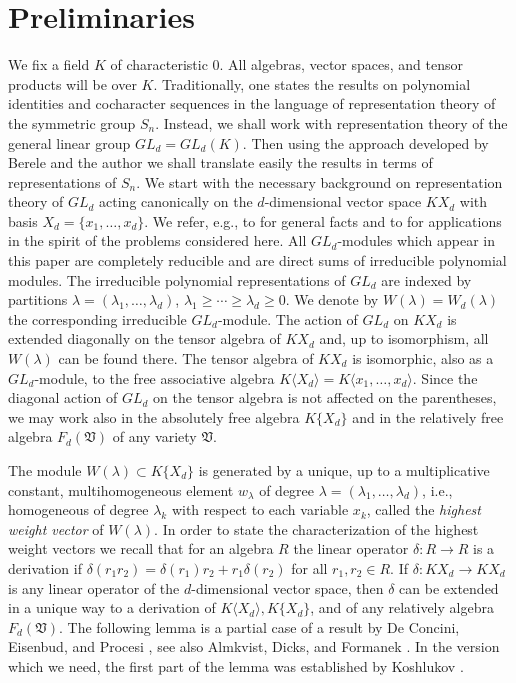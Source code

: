 \documentclass{amsart}[12pt]
\theoremstyle{definition}
\begin{document}
\section{Preliminaries}

We fix a field $K$ of characteristic 0. All algebras, vector spaces, and tensor products will be over $K$.
Traditionally, one states the results on polynomial identities and cocharacter sequences in the language of representation theory
of the symmetric group $S_n$. Instead, we shall work with representation theory
of the general linear group $GL_d=GL_d(K)$. Then using the approach developed by Berele \cite{B} and the author \cite{D0}
we shall translate easily the results in terms of representations of $S_n$.
We start with the necessary background on representation theory
of $GL_d$ acting canonically on the $d$-dimensional vector space $KX_d$
with basis $X_d=\{x_1,\ldots,x_d\}$.
We refer, e.g., to \cite{M} for general facts and to \cite{D2}  for applications in the spirit of the problems
considered here.
All $GL_d$-modules which appear in this paper are
completely reducible and are direct sums of irreducible polynomial
modules. The irreducible polynomial representations of $GL_d$ are
indexed by partitions $\lambda=(\lambda_1,\ldots,\lambda_d)$,
$\lambda_1\geq \cdots\geq \lambda_d\geq 0$. We denote by
$W(\lambda)=W_d(\lambda)$ the corresponding irreducible $GL_d$-module.
The action of $GL_d$ on $KX_d$ is extended diagonally on the tensor algebra of $KX_d$
and, up to isomorphism, all $W(\lambda)$ can be found there. The tensor algebra of $KX_d$
is isomorphic, also as a $GL_d$-module, to the free associative algebra $K\langle X_d\rangle=K\langle x_1,\ldots,x_d\rangle$.
Since the diagonal action of $GL_d$ on the tensor algebra is not affected on the parentheses, we may work also in the absolutely free
algebra $K\{X_d\}$ and in the relatively free algebra $F_d({\mathfrak V})$ of any variety $\mathfrak V$.

The module $W(\lambda)\subset K\{X_d\}$ is generated by a
unique, up to a multiplicative constant,
multihomogeneous element $w_{\lambda}$ of degree $\lambda=(\lambda_1,\ldots,\lambda_d)$, i.e.,
homogeneous of degree $\lambda_k$ with respect to each variable $x_k$,
called the {\it highest weight vector} of $W(\lambda)$.
In order to state the characterization of the highest weight vectors we recall that for an algebra $R$
the linear operator $\delta:R\to R$ is a derivation
if $\delta(r_1r_2)=\delta(r_1)r_2+r_1\delta(r_2)$ for all $r_1,r_2\in R$.
If $\delta:KX_d\to KX_d$ is any linear operator of the $d$-dimensional vector space, then $\delta$ can be extended
in a unique way to a derivation of $K\langle X_d\rangle, K\{X_d\}$, and of any relatively algebra $F_d({\mathfrak V})$.
The following lemma is a partial case of a result by
De Concini, Eisenbud, and Procesi \cite{DEP}, see also
Almkvist, Dicks, and Formanek \cite{ADF}.
In the version which we need, the first part of the lemma was established
by Koshlukov \cite{K}.
\end{document}
